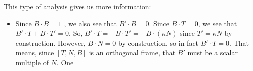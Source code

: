 This type of analysis gives us more information:
\begin{itemize}
\item Since $B \cdot B = 1$ , we also see that $B' \cdot B = 0$. Since
  $B \cdot T = 0$, we see that $B' \cdot T + B \cdot T' = 0$. So, $B'
  \cdot T = -B \cdot T' = -B \cdot (\kappa N)$ since $T' = \kappa N$
  by construction. However, $B \cdot N = 0$ by construction, so in
  fact $B' \cdot T = 0$. 
That means, since $[T, N, B]$ is an orthogonal frame, that $B'$ must
be a scalar multiple of $N$. One 
\end{itemize}

